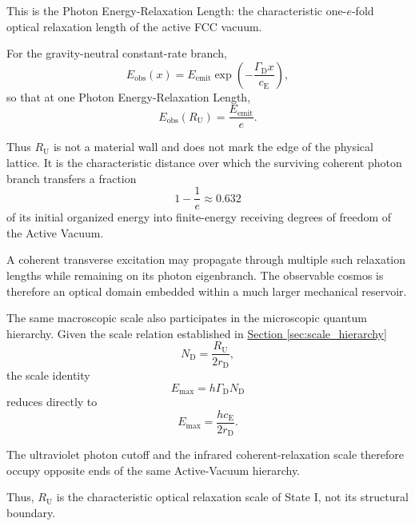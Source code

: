 This is the Photon Energy-Relaxation Length: the characteristic one-$e$-fold optical relaxation length of the active FCC vacuum.

For the gravity-neutral constant-rate branch,
\begin{equation}
    E_{\mathrm{obs}}(x)
    =
    E_{\mathrm{emit}}
    \exp\left(
        -\frac{\Gamma_{\mathrm D}x}{c_{\mathrm E}}
    \right),
\end{equation}
so that at one Photon Energy-Relaxation Length,
\begin{equation}
    E_{\mathrm{obs}}(R_{\mathrm U})
    =
    \frac{E_{\mathrm{emit}}}{e}.
\end{equation}

Thus $R_{\mathrm U}$ is not a material wall and does not mark the edge of the physical lattice. It is the characteristic distance over which the surviving coherent photon branch transfers a fraction
\begin{equation}
    1-\frac{1}{e}
    \approx
    0.632
\end{equation}
of its initial organized energy into finite-energy receiving degrees of freedom of the Active Vacuum.

A coherent transverse excitation may propagate through multiple such relaxation lengths while remaining on its photon eigenbranch. The observable cosmos is therefore an optical domain embedded within a much larger mechanical reservoir.

The same macroscopic scale also participates in the microscopic quantum hierarchy. Given the scale relation established in \hyperref[sec:scale_hierarchy]{Section \ref*{sec:scale_hierarchy}}
\begin{equation}
    N_{\mathrm D}
    =
    \frac{R_{\mathrm U}}{2r_{\mathrm D}},
\end{equation}
the scale identity
\begin{equation}
    E_{\mathrm{max}}
    =
    h\Gamma_{\mathrm D}N_{\mathrm D}
\end{equation}
reduces directly to
\begin{equation}
    E_{\mathrm{max}}
    =
    \frac{hc_{\mathrm E}}{2r_{\mathrm D}}.
\end{equation}

The ultraviolet photon cutoff and the infrared coherent-relaxation scale therefore occupy opposite ends of the same Active-Vacuum hierarchy.

Thus, $R_{\mathrm U}$ is the characteristic optical relaxation scale of State I, not its structural boundary.


